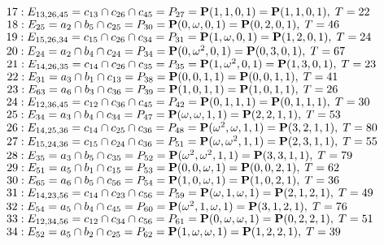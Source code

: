 \documentclass{article}
\newcommand{\bP}{{\bf P}}
\begin{document}
{$17 : E_{13,26,45}=c_{13} \cap c_{26} \cap c_{45} = P_{27}=\bP(1, 1, 0, 1) = \bP(1, 1, 0, 1),\; T= 22$\\
$18 : E_{25}=a_{2} \cap b_{5} \cap c_{25} = P_{30}=\bP(0, \omega , 0, 1) = \bP(0, 2, 0, 1),\; T= 46$\\
$19 : E_{15,26,34}=c_{15} \cap c_{26} \cap c_{34} = P_{31}=\bP(1, \omega , 0, 1) = \bP(1, 2, 0, 1),\; T= 24$\\
$20 : E_{24}=a_{2} \cap b_{4} \cap c_{24} = P_{34}=\bP(0, \omega^{2}, 0, 1) = \bP(0, 3, 0, 1),\; T= 67$\\
$21 : E_{14,26,35}=c_{14} \cap c_{26} \cap c_{35} = P_{35}=\bP(1, \omega^{2}, 0, 1) = \bP(1, 3, 0, 1),\; T= 23$\\
$22 : E_{31}=a_{3} \cap b_{1} \cap c_{13} = P_{38}=\bP(0, 0, 1, 1) = \bP(0, 0, 1, 1),\; T= 41$\\
$23 : E_{63}=a_{6} \cap b_{3} \cap c_{36} = P_{39}=\bP(1, 0, 1, 1) = \bP(1, 0, 1, 1),\; T= 26$\\
$24 : E_{12,36,45}=c_{12} \cap c_{36} \cap c_{45} = P_{42}=\bP(0, 1, 1, 1) = \bP(0, 1, 1, 1),\; T= 30$\\
$25 : E_{34}=a_{3} \cap b_{4} \cap c_{34} = P_{47}=\bP(\omega , \omega , 1, 1) = \bP(2, 2, 1, 1),\; T= 53$\\
$26 : E_{14,25,36}=c_{14} \cap c_{25} \cap c_{36} = P_{48}=\bP(\omega^{2}, \omega , 1, 1) = \bP(3, 2, 1, 1),\; T= 80$\\
$27 : E_{15,24,36}=c_{15} \cap c_{24} \cap c_{36} = P_{51}=\bP(\omega , \omega^{2}, 1, 1) = \bP(2, 3, 1, 1),\; T= 55$\\
$28 : E_{35}=a_{3} \cap b_{5} \cap c_{35} = P_{52}=\bP(\omega^{2}, \omega^{2}, 1, 1) = \bP(3, 3, 1, 1),\; T= 79$\\
$29 : E_{51}=a_{5} \cap b_{1} \cap c_{15} = P_{53}=\bP(0, 0, \omega , 1) = \bP(0, 0, 2, 1),\; T= 62$\\
$30 : E_{65}=a_{6} \cap b_{5} \cap c_{56} = P_{54}=\bP(1, 0, \omega , 1) = \bP(1, 0, 2, 1),\; T= 36$\\
$31 : E_{14,23,56}=c_{14} \cap c_{23} \cap c_{56} = P_{59}=\bP(\omega , 1, \omega , 1) = \bP(2, 1, 2, 1),\; T= 49$\\
$32 : E_{54}=a_{5} \cap b_{4} \cap c_{45} = P_{60}=\bP(\omega^{2}, 1, \omega , 1) = \bP(3, 1, 2, 1),\; T= 76$\\
$33 : E_{12,34,56}=c_{12} \cap c_{34} \cap c_{56} = P_{61}=\bP(0, \omega , \omega , 1) = \bP(0, 2, 2, 1),\; T= 51$\\
$34 : E_{52}=a_{5} \cap b_{2} \cap c_{25} = P_{62}=\bP(1, \omega , \omega , 1) = \bP(1, 2, 2, 1),\; T= 39$\\
}
\end{document}
